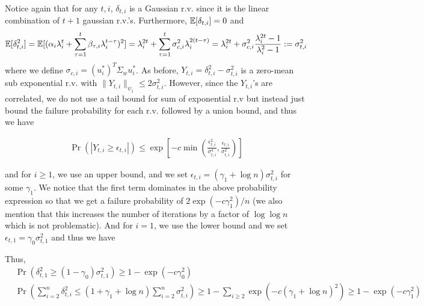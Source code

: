 \documentclass[10pt]{article}
\begin{document}
Notice again that for any $t,i$, $\delta_{t,i}$ is a Gaussian r.v. since it is the linear combination of $t+1$ gaussian r.v.'s. Furthermore, $\mathbb{E}[\delta_{t,i}] = 0$ and 
\begin{align*}
\mathbb{E}[\delta_{t,i}^2] = \mathbb{E}[(\alpha_i \lambda_i^t + \sum_{\tau=1}^t \beta_{\tau,i} \lambda_i^{t-\tau})^2] = \lambda_i^{2t} +  \sum_{\tau=1}^t \sigma_{c,i}^2 \lambda_i^{2(t-\tau)} = \lambda_i^{2t} + \sigma_{c,i}^2 \frac{\lambda_i^{2t}-1}{\lambda_i^2-1} := \sigma_{t,i}^2
\end{align*}
where we define $\sigma_{c,i} = (u_i^*)^T \Sigma_w u_i^*$. As before, $Y_{t,i} = \delta_{t,i}^2 - \sigma_{t,i}^2$ is a zero-mean sub exponential r.v. with $\|Y_{t,i}\|_{\psi_1} \leq 2 \sigma_{t,i}^2$. However, since the $Y_{t,i}$'s are correlated, we do not use a tail bound for sum of exponential r.v but instead just bound the failure probability for each r.v. followed by a union bound, and thus we have

\begin{align}\label{eq:del_bnd}
\Pr\left( |Y_{t,i} \geq \epsilon_{t,i}| \right) \leq \exp\left[-c\min\left(\frac{\epsilon_{t,i}^2}{\sigma_{t,i}^4}, \frac{\epsilon_{t,i}}{\sigma_{t,i}^2} \right)\right]
\end{align}

and for $i \geq 1$, we use an upper bound, and we set $\epsilon_{t,i} = ({\gamma}_1 + \log n) \sigma_{t,i}^2$ for some ${\gamma}_1$. We notice that the first term dominates in the above probability expression so that we get a failure probability of $2 \exp(-c \gamma_1^2)/n$ {\color{blue} (we also mention that this increases the number of iterations by a factor of $\log \log n$ which is not problematic)}. And for $i=1$, we use the lower bound and we set $\epsilon_{t,1} = \gamma_0 \sigma_{t,1}^2$ and thus we have


Thus, 
\begin{align*}
&\Pr\left( \delta_{t,1}^2 \geq (1 - \gamma_0) \sigma_{t,1}^2 \right) \geq 1 - \exp(-c \gamma_0^2) \\ 
&\Pr\left( \sum_{i =2}^n \delta_{t,i}^2 \leq (1 + \gamma_1 + \log n) \sum_{i=2}^n \sigma_{t,i}^2 \right) \geq 1 - \sum_{i\geq 2} \exp(-c (\gamma_1 + \log n)^2) \geq 1 - \exp(-c {\gamma}_1^2) \\ 
\end{align*}
\end{document}
